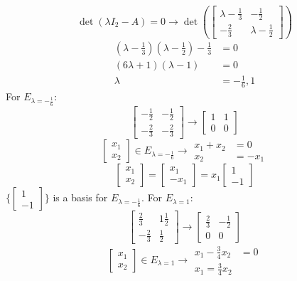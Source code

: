 \documentclass[12pt]{article}
\begin{document}
\begin{example}
$$\det(\lambda I_2 - A) = 0 \rightarrow \det(\begin{bmatrix} \lambda - \frac{1}{3} & -\frac{1}{2} \\ -\frac{2}{3} & \lambda - \frac{1}{2} \end{bmatrix}) $$
$$\begin{aligned} (\lambda - \frac{1}{3})(\lambda - \frac{1}{2}) - \frac{1}{3} &= 0 \\ (6\lambda + 1)(\lambda - 1) &= 0 \\ \lambda &= -\frac{1}{6}, 1 \end{aligned} $$ 
For $E_{\lambda = -\frac{1}{6}}$: $$\begin{bmatrix} -\frac{1}{2} & -\frac{1}{2} \\ -\frac{2}{3} & -\frac{2}{3} \end{bmatrix} \rightarrow \begin{bmatrix} 1 & 1 \\ 0 & 0 \end{bmatrix} $$
$$ \begin{bmatrix} x_1 \\ x_2 \end{bmatrix} \in E_{\lambda = -\frac{1}{6}} \rightarrow \begin{aligned} x_1 + x_2 &= 0 \\ x_2 &= -x_1 \end{aligned} $$ 
$$ \begin{bmatrix} x_1 \\ x_2 \end{bmatrix} = \begin{bmatrix} x_1 \\ -x_1 \end{bmatrix} = x_1\begin{bmatrix} 1 \\ -1 \end{bmatrix} $$ 
$\{\begin{bmatrix} 1 \\ -1 \end{bmatrix}\}$ is a basis for $E_{\lambda = -\frac{1}{6}}$. \newline 
For $E_{\lambda = 1}$: $$\begin{bmatrix} \frac{2}{3} & 1\frac{1}{2} \\ -\frac{2}{3} & \frac{1}{2} \end{bmatrix} \rightarrow \begin{bmatrix} \frac{2}{3} & -\frac{1}{2} \\ 0 & 0 \end{bmatrix} $$ $$ \begin{bmatrix} x_1 \\ x_2 \end{bmatrix} \in E_{\lambda = 1} \rightarrow \begin{aligned} x_1 - \frac{3}{4}x_2 &= 0 \\ x_1 = \frac{3}{4}x_2 \end{aligned} $$

\end{example}
\end{document}
